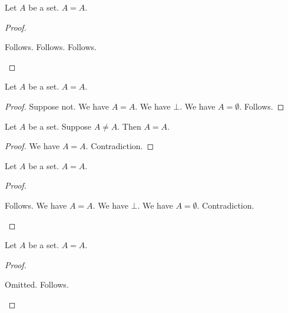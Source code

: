 \begin{proposition}\label{cases_exact}
    Let $A$ be a set.
    $A=A$.
\end{proposition}
\begin{proof}
    \begin{byCase}
        Follows.
        Follows.
        Follows.
    \end{byCase}
\end{proof}

\begin{proposition}\label{by_contradiction_exact}
    Let $A$ be a set.
    $A=A$.
\end{proposition}
\begin{proof}
    Suppose not.
    We have $A=A$.
    We have $\bot$.
    We have $A=\emptyset$.
    Follows.
\end{proof}

\begin{proposition}\label{arbitrary_contradiction_exact}
    Let $A$ be a set.
    Suppose $A\neq A$.
    Then $A=A$.
\end{proposition}
\begin{proof}
    We have $A=A$.
    Contradiction.
\end{proof}

\begin{proposition}\label{case_contradiction_intermediate_exact}
    Let $A$ be a set.
    $A=A$.
\end{proposition}
\begin{proof}
    \begin{byCase}
        Follows.
        We have $A=A$.
        We have $\bot$.
        We have $A=\emptyset$.
        Contradiction.
    \end{byCase}
\end{proof}

\begin{proposition}\label{omitted_case_exact}
    Let $A$ be a set.
    $A=A$.
\end{proposition}
\begin{proof}
    \begin{byCase}
        Omitted.
        Follows.
    \end{byCase}
\end{proof}

